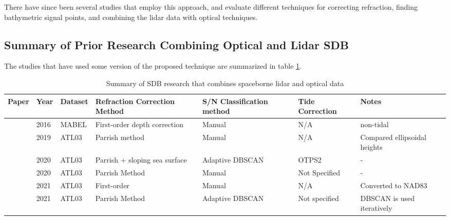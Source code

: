 There have since been several studies that employ this approach, and evaluate different techniques for correcting refraction, finding bathymetric signal points, and combining the lidar data with optical techniques.

\subsection{Summary of Prior Research Combining Optical and Lidar SDB}

The studies that have used some version of the proposed technique are summarized in table \ref{tab:researchsummary}.

\begin{landscape}
      \begin{table}
            \caption{Summary of SDB research that combines spaceborne lidar and optical data}
            \label{tab:researchsummary}
            \raggedright
            \begin{tabular}{p{3.7cm}llp{3.2cm}p{3.5cm}ll}
                  \midrule
                  Paper                              & Year & Dataset & Refraction Correction Method  & S/N Classification method      & Tide Correction & Notes                        \\
                  \hline
                  \citeauthor{Forfinski-Sarkozi2016} & 2016 & MABEL   & First-order depth correction  & Manual                         & N/A             & non-tidal                    \\
                  \citeauthor{Parrish2019}           & 2019 & ATL03   & Parrish method                & Manual                         & N/A             & Compared ellipsoidal heights \\
                  \citeauthor{Ma2020}                & 2020 & ATL03   & Parrish + sloping sea surface & Adaptive DBSCAN                & OTPS2           & -                            \\
                  \citeauthor{Thomas2021d}           & 2020 & ATL03   & Parrish Method                & Manual                         & Not Specified   & -                            \\
                  \citeauthor{Albright2021}          & 2021 & ATL03   & First-order                   & Manual                         & N/A             & Converted to NAD83           \\
                  \citeauthor{Xie2021}               & 2021 & ATL03   & Parrish Method                & Adaptive DBSCAN                & Not specified   & DBSCAN is used iteratively   \\

\end{tabular}
\end{table}
\end{landscape}
